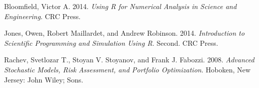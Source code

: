 \documentclass[11pt,]{article}
\begin{document}
\hypertarget{refs}{}
\hypertarget{ref-Bloomfield:2014}{}
Bloomfield, Victor A. 2014. \emph{Using R for Numerical Analysis in
Science and Engineering}. CRC Press.

\hypertarget{ref-Jones_et_al:2014}{}
Jones, Owen, Robert Maillardet, and Andrew Robinson. 2014.
\emph{Introduction to Scientific Programming and Simulation Using R}.
Second. CRC Press.

\hypertarget{ref-Rachev:2008}{}
Rachev, Svetlozar T., Stoyan V. Stoyanov, and Frank J. Fabozzi. 2008.
\emph{Advanced Stochastic Models, Risk Assessment, and Portfolio
Optimization}. Hoboken, New Jersey: John Wiley; Sons.
\end{document}
